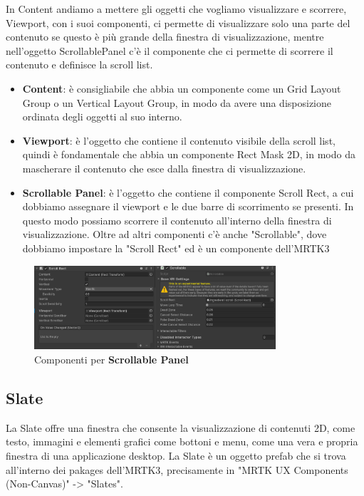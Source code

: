 In Content andiamo a mettere gli oggetti che vogliamo visualizzare e scorrere, Viewport, con i suoi componenti, ci permette di visualizzare solo una parte del contenuto se questo è più grande della finestra di visualizzazione, mentre nell'oggetto ScrollablePanel c'è il componente che ci permette di scorrere il contenuto e definisce la scroll list. 
\begin{itemize}
    \item \textbf{Content}: è consigliabile che abbia un componente come un Grid Layout Group o un Vertical Layout Group, in modo da avere una disposizione ordinata degli oggetti al suo interno.
    \item \textbf{Viewport}: è l'oggetto che contiene il contenuto visibile della scroll list, quindi è fondamentale che abbia un componente Rect Mask 2D, in modo da mascherare il contenuto che esce dalla finestra di visualizzazione.
    \item \textbf{Scrollable Panel}: è l'oggetto che contiene il componente Scroll Rect, a cui dobbiamo assegnare il viewport e le due barre di scorrimento se presenti. In questo modo possiamo scorrere il contenuto all'interno della finestra di visualizzazione. Oltre ad altri componenti c'è anche "Scrollable", dove dobbiamo impostare la "Scroll Rect" ed è un componente dell'MRTK3
\end{itemize}

\begin{figure}[H]
    \centering
    \includegraphics[width=0.8\textwidth,height=\textheight,keepaspectratio]{figures/chapter_1/ComponentiScrollBar.png}
    \caption{Componenti per \textbf{Scrollable Panel}}
\end{figure}

\subsection{Slate}
La Slate offre una finestra che consente la visualizzazione di contenuti 2D, come testo, immagini e elementi grafici come bottoni e menu, come una vera e propria finestra di una applicazione desktop. La Slate è un oggetto prefab che si trova all'interno dei pakages dell'MRTK3, precisamente in "MRTK UX Components (Non-Canvas)" -> "Slates".

